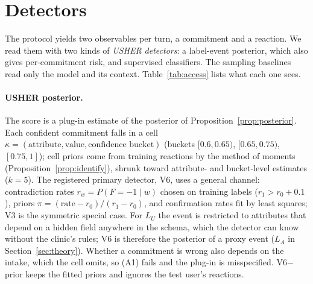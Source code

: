 \documentclass[10pt,a4paper,twocolumn]{article}
\newcommand{\LU}{L_{U}}
\begin{document}


\section{Detectors}
\label{sec:detectors}

The protocol yields two observables per turn, a commitment and a reaction. We read
them with two kinds of \emph{USHER detectors}: a label-event posterior, which
also gives per-commitment risk, and supervised classifiers. The sampling
baselines read only the model and its context. Table~\ref{tab:access} lists what each one sees.

\paragraph{USHER posterior.} The score is a plug-in estimate of the posterior
of Proposition~\ref{prop:posterior}. Each confident commitment falls in a
cell $\kappa=(\text{attribute},\text{value},\text{confidence bucket})$
(buckets $[0.6,0.65)$, $[0.65,0.75)$, $[0.75,1]$); cell priors come from
training reactions by the method of moments
(Proposition~\ref{prop:identify}), shrunk toward attribute- and bucket-level
estimates ($k=5$). The registered primary detector, V6, uses a general
channel: contradiction rates $r_w=P(F=-1\mid w)$ chosen on training labels
($r_1>r_0+0.1$), priors $\pi=(\text{rate}-r_0)/(r_1-r_0)$, and confirmation
rates fit by least squares; V3 is the symmetric special case. For $\LU$ the
event is restricted to attributes that depend on a hidden field anywhere in
the schema, which the detector can know without the clinic's rules; V6 is
therefore the posterior of a proxy event ($L_A$ in Section~\ref{sec:theory}).
Whether a commitment is wrong also depends on the intake, which the cell
omits, so (A1) fails and the plug-in is misspecified. V6$-$prior keeps the
fitted priors and ignores the test user's reactions.
\end{document}
